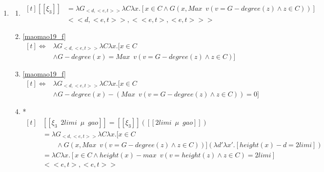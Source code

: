 \documentclass{ctexart}
\begin{document}
\begin{enumerate}
    \item \label{maomao20}
    \begin{enumerate}
        \item \label{maomao20_b}
        $\begin{aligned}[t]
            [\![\xi_3]\!] &= \lambda G_{<d,<e,t>>} \lambda C \lambda x. [x \in C \land G(x,Max \enspace v(v=G-degree(z) \land z \in C))] \\
            & <<d,<e,t>>, <<e,t>,<e,t>>>
        \end{aligned}$

        \item \label{maomao20_c}
        \ref{maomao19_f} 
        $\begin{aligned}[t]
            \Leftrightarrow &\lambda G_{<d,<e,t>>} \lambda C \lambda x. [x \in C \\
            & \land G-degree(x)=Max \enspace v(v=G-degree(z) \land z \in C)]
        \end{aligned}$

        \item \label{maomao20_d}
        \ref{maomao19_f} 
        $\begin{aligned}[t]
            \Leftrightarrow &\lambda G_{<d,<e,t>>} \lambda C \lambda x. [x \in C \\
            & \land G-degree(x) - (Max \enspace v(v=G-degree(z) \land z \in C)) = 0]
        \end{aligned}$

        \item \label{maomao20_e}
        * $\begin{aligned}[t]
            &[\![\xi_3 \enspace 2 limi \enspace \mu \enspace gao]\!] = [\![\xi_3]\!]([\![2 limi \enspace \mu \enspace gao]\!]) \\
            &= \lambda G_{<d,<e,t>>}\lambda C \lambda x. [x \in C \\
            &\qquad \land G(x,Max \enspace v(v=G-degree(z) \land z \in C))](\lambda d' \lambda x'.[height(x)-d=2limi]) \\
            &=\lambda C \lambda x.[x \in C \land height(x)-max \enspace v(v=height(z) \land z \in C)=2limi]\\
            & <<e,t>,<e,t>>
        \end{aligned}$

    \end{enumerate}
\end{enumerate}
\end{document}
